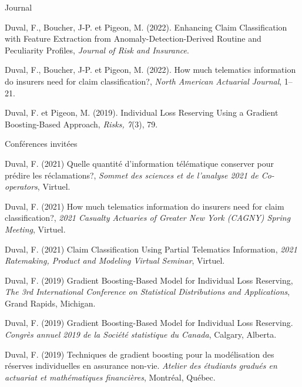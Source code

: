 
\begin{cventries}
  \cventry
    {} %
    {Journal} %
    {} %
    {} %
    {
      \begin{cvitems} %
        \item {Duval, F., Boucher, J-P. et Pigeon, M. (2022). Enhancing Claim Classification with Feature Extraction from Anomaly-Detection-Derived Routine and Peculiarity Profiles, \textit{Journal of Risk and Insurance}.}
        \item {Duval, F., Boucher, J-P. et Pigeon, M. (2022). How much telematics information do insurers need for claim classification?, \textit{North American Actuarial Journal}, 1--21.}
        \item {Duval, F. et Pigeon, M. (2019). Individual Loss Reserving Using a Gradient Boosting-Based Approach, \textit{Risks, 7}(3), 79.}
      \end{cvitems}
    }

  \cventry
    {} %
    {Conférences invitées} %
    {} %
    {} %
    {
      \begin{cvitems} %
      \item {Duval, F. (2021) Quelle quantité d’information télématique conserver pour prédire les réclamations?, \textit{Sommet des sciences et de l'analyse 2021 de Co-operators}, Virtuel.}
      \item {Duval, F. (2021) How much telematics information do insurers need for claim classification?, \textit{2021 Casualty Actuaries of Greater New York (CAGNY) Spring Meeting}, Virtuel.}
        \item {Duval, F. (2021) Claim Classification Using Partial Telematics Information, \textit{2021 Ratemaking, Product and Modeling Virtual Seminar}, Virtuel.}
      	\item {Duval, F. (2019) Gradient Boosting-Based Model for Individual Loss Reserving, \textit{The 3rd International Conference on Statistical Distributions and Applications}, Grand Rapids, Michigan.}
      	\item {Duval, F. (2019) Gradient Boosting-Based Model for Individual Loss Reserving. \textit{Congrès annuel 2019 de la Société statistique du Canada}, Calgary, Alberta.}
      	\item {Duval, F. (2019) Techniques de gradient boosting pour la modélisation des réserves individuelles en assurance non-vie. \textit{Atelier des étudiants gradués en actuariat et mathématiques financières}, Montréal, Québec.}
      \end{cvitems}
    }
    

\end{cventries}
